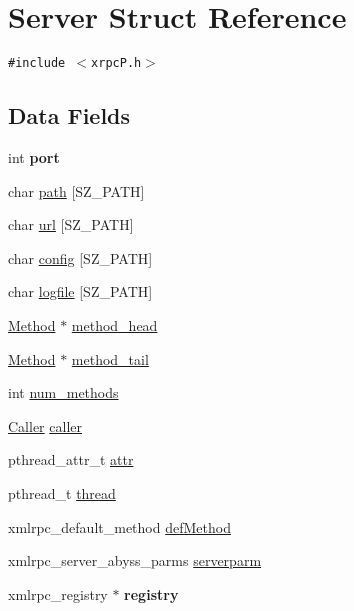 \hypertarget{structServer}{
\section{Server Struct Reference}
\label{structServer}
}
{\tt \#include $<$xrpcP.h$>$}

\subsection*{Data Fields}
\begin{CompactItemize}
\item 
\hypertarget{structServer_926c9dae229a62b6d33fdbb41dca6d82}{
int \textbf{port}}
\label{structServer_926c9dae229a62b6d33fdbb41dca6d82}

\item 
char \hyperlink{structServer_3e5bdf6e881fe987617dbbe420ed39a7}{path} \mbox{[}SZ\_\-PATH\mbox{]}
\item 
char \hyperlink{structServer_732b4b0eb4208cc8618eeda41d35effa}{url} \mbox{[}SZ\_\-PATH\mbox{]}
\item 
char \hyperlink{structServer_25c424b3c00a12aefd80dd82dafa1f9f}{config} \mbox{[}SZ\_\-PATH\mbox{]}
\item 
char \hyperlink{structServer_520e88309f2f48106caa1fb6bacd9b3b}{logfile} \mbox{[}SZ\_\-PATH\mbox{]}
\item 
\hyperlink{structMethod}{Method} $\ast$ \hyperlink{structServer_0d3f35225f9d2bcb9350016948e77ada}{method\_\-head}
\item 
\hyperlink{structMethod}{Method} $\ast$ \hyperlink{structServer_baf5367f677cc45e2b46d08989a068e4}{method\_\-tail}
\item 
int \hyperlink{structServer_fd95ab28088415ee5900bd6bf70dc0a2}{num\_\-methods}
\item 
\hyperlink{structCaller}{Caller} \hyperlink{structServer_bac1edd9485d6c86e5d6273c9e7efe79}{caller}
\item 
pthread\_\-attr\_\-t \hyperlink{structServer_922879601b599ff38a9638a72da810fa}{attr}
\item 
pthread\_\-t \hyperlink{structServer_b30292985309c492e4ba0ebbf2a6934a}{thread}
\item 
xmlrpc\_\-default\_\-method \hyperlink{structServer_bafe10e20203238b2f957419066955be}{defMethod}
\item 
xmlrpc\_\-server\_\-abyss\_\-parms \hyperlink{structServer_62bc9dc3ae8328ac0781cc3c7cbe148c}{serverparm}
\item 
\hypertarget{structServer_039a46ab56a4118f4013ca22cf042e4a}{
xmlrpc\_\-registry $\ast$ \textbf{registry}}
\label{structServer_039a46ab56a4118f4013ca22cf042e4a}


\end{CompactItemize}
